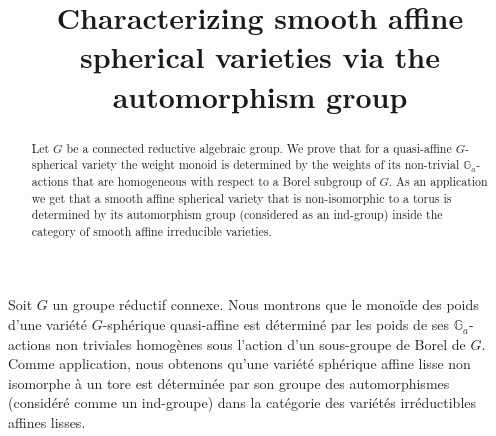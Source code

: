 \documentclass[JEP,XML,SOM,Unicode]{cedram}
\theoremstyle{plain}
\theoremstyle{definition}
\begin{document}
\frontmatter

\title[Characterizing smooth affine spherical varieties]
{Characterizing smooth affine spherical varieties via the automorphism group}

\author[\initial{A.} \lastname{Regeta}]{ }
\address{Fakultät für Mathematik und Informatik, Friedrich-Schiller-Universität Jena\\
Ernst-Abbe-Platz 2, DE-07743 Jena, Germany}

\author[\initial{I.} \lastname{van Santen}]{ }
\address{Departement Mathematik und Informatik, Universität Basel,\\
Spiegelgasse 1, CH-4051 Basel, Switzerland}



\begin{abstract}
Let $G$ be a connected reductive algebraic group. We prove that for a quasi-affine $G$-spherical variety the weight monoid is determined by the weights of its non-trivial $\mathbb{G}_a$-actions that are homogeneous with respect to a Borel subgroup of $G$. As an application we get that a smooth affine spherical variety that is non-isomorphic to a torus is determined by its automorphism group (considered as an ind-group) inside the category of smooth affine irreducible varieties.
\end{abstract}



\begin{altabstract}
Soit $G$ un groupe réductif connexe. Nous montrons que le monoïde des poids d'une variété $G$-sphérique quasi-affine est déterminé par les poids de ses $\mathbb{G}_a$-actions non triviales homogènes sous l'action d'un sous-groupe de Borel de $G$. Comme application, nous obtenons qu'une variété sphérique affine lisse non isomorphe à un tore est déterminée par son groupe des automorphismes (considéré comme un ind-groupe) dans la catégorie des variétés irréductibles affines lisses.\end{altabstract}
\end{document}

